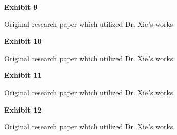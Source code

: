 \documentclass{article}
\begin{document}


\vspace*{\fill}

\begin{center}

{\LARGE \bf
Exhibit 9
}

\vspace{10\baselineskip}

{\large Original research paper which utilized Dr. Xie’s works}

\end{center}
\vspace*{\fill}



\vspace*{\fill}

\begin{center}

{\LARGE \bf
Exhibit 10
}

\vspace{10\baselineskip}

{\large Original research paper which utilized Dr. Xie’s works}

\end{center}
\vspace*{\fill}



\vspace*{\fill}

\begin{center}

{\LARGE \bf
Exhibit 11
}

\vspace{10\baselineskip}

{\large Original research paper which utilized Dr. Xie’s works}

\end{center}
\vspace*{\fill}



\vspace*{\fill}

\begin{center}

{\LARGE \bf
Exhibit 12
}

\vspace{10\baselineskip}

{\large Original research paper which utilized Dr. Xie’s works}

\end{center}
\vspace*{\fill}
\end{document}
